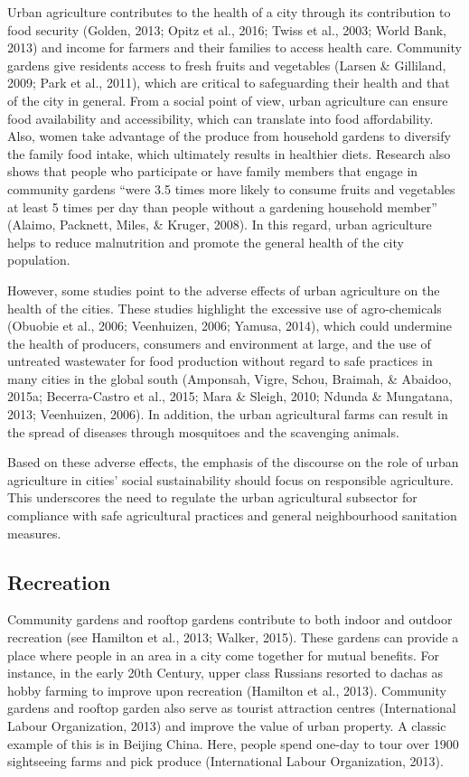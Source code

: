 Urban agriculture contributes to the health of a city through its contribution to food security (Golden, 2013; Opitz et al., 2016; Twiss et al., 2003; World Bank, 2013) and income for farmers and their families to access health care. Community gardens give residents access to fresh fruits and vegetables (Larsen \& Gilliland, 2009; Park et al., 2011), which are critical to safeguarding their health and that of the city in general. From a social point of view, urban agriculture can ensure food availability and accessibility, which can translate into food affordability. Also, women take advantage of the produce from household gardens to diversify the family food intake, which ultimately results in healthier diets. Research also shows that people who participate or have family members that engage in community gardens “were 3.5 times more likely to consume fruits and vegetables at least 5 times per day than people without a gardening household member” (Alaimo, Packnett, Miles, \& Kruger, 2008). In this regard, urban agriculture helps to reduce malnutrition and promote the general health of the city population.

However, some studies point to the adverse effects of urban agriculture on the health of the cities. These studies highlight the excessive use of agro-chemicals (Obuobie et al., 2006; Veenhuizen, 2006; Yamusa, 2014), which could undermine the health of producers, consumers and environment at large, and the use of untreated wastewater for food production without regard to safe practices in many cities in the global south (Amponsah, Vigre, Schou, Braimah, \& Abaidoo, 2015a; Becerra-Castro et al., 2015; Mara \& Sleigh, 2010; Ndunda \& Mungatana, 2013; Veenhuizen, 2006). In addition, the urban agricultural farms can result in the spread of diseases through mosquitoes and the scavenging animals.

Based on these adverse effects, the emphasis of the discourse on the role of urban agriculture in cities' social sustainability should focus on responsible agriculture. This underscores the need to regulate the urban agricultural subsector for compliance with safe agricultural practices and general neighbourhood sanitation measures.

\subsection{Recreation}

Community gardens and rooftop gardens contribute to both indoor and outdoor recreation (see Hamilton et al., 2013; Walker, 2015). These gardens can provide a place where people in an area in a city come together for mutual benefits. For instance, in the early 20th Century, upper class Russians resorted to dachas as hobby farming to improve upon recreation (Hamilton et al., 2013). Community gardens and rooftop garden also serve as tourist attraction centres (International Labour Organization, 2013) and improve the value of urban property. A classic example of this is in Beijing China. Here, people spend one-day to tour over 1900 sightseeing farms and pick produce (International Labour Organization, 2013).


